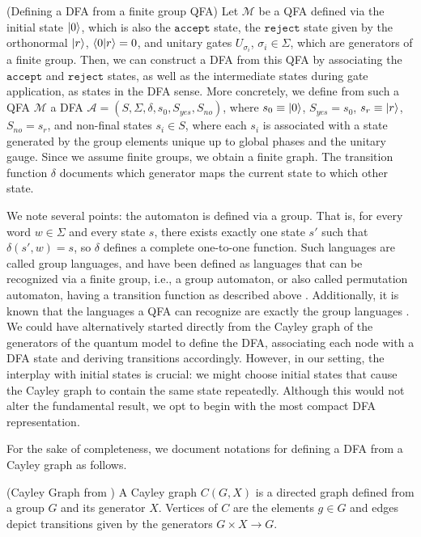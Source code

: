 \documentclass[../main.tex]{subfiles}
\begin{document}
\begin{definition} \label{def:dfafromqfa} (Defining a DFA from a finite group QFA)
 Let $\mathcal{M}$ be a QFA defined via the initial state $\ket{0}$, which is also the $\mathtt{accept}$ state, the $\mathtt{reject}$  state given by the orthonormal $\ket{r}$, $\bra{0}\ket{r} = 0$, and unitary gates $U_{\sigma_i}$, $\sigma_i \in \Sigma$, which are generators of a finite group. Then, we can construct a DFA from this QFA by associating the $\mathtt{accept}$ and $\mathtt{reject}$  states, as well as the intermediate states during gate application, as states in the DFA sense. More concretely, we define from such a QFA $\mathcal{M}$ a DFA $\mathcal{A} = (S, \Sigma, \delta, s_0, S_{yes}, S_{no})$, where $s_0 \equiv \ket{0}$, $S_{yes} = { s_0 }$, $s_r \equiv \ket{r}$, $S_{no} = { s_r }$, and non-final states $s_i \in S$, where each $s_i$ is associated with a state generated by the group elements unique up to global phases and the unitary gauge. Since we assume finite groups, we obtain a finite graph. The transition function $\delta$ documents which generator maps the current state to which other state.
\end{definition}

We note several points: the automaton is defined via a group. That is, for every word $w \in \Sigma$ and every state $s$, there exists exactly one state $s'$ such that $\delta(s',w)=s$, so $\delta$ defines a complete one-to-one function. Such languages are called group languages, and have been defined as languages that can be recognized via a finite group, i.e., a group automaton, or also called permutation automaton, having a transition function as described above \cite{thierrin1968permutation,place2022group}. Additionally, it is known that the languages a \ac{QFA} can recognize are exactly the group languages \cite{brodsky1999characterizations}. We could have alternatively started directly from the Cayley graph of the generators of the quantum model to define the DFA, associating each node with a DFA state and deriving transitions accordingly. However, in our setting, the interplay with initial states is crucial: we might choose initial states that cause the Cayley graph to contain the same state repeatedly. Although this would not alter the fundamental result, we opt to begin with the most compact DFA representation.

For the sake of completeness, we document notations for defining a \ac{DFA} from a Cayley graph as follows.

\begin{definition} (Cayley Graph from \cite{cayley1878desiderata})
     A Cayley graph $C(G,X)$ is a directed graph defined from a group $G$ and its generator $X$. Vertices of $C$ are the elements $g \in G$ and edges depict transitions given by the generators $G \times X \rightarrow G$.
\end{definition}
\end{document}
